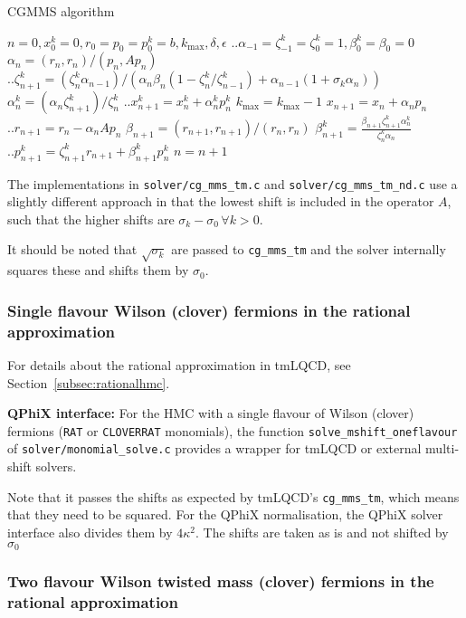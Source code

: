 \begin{algorithm}
  \caption{CGMMS algorithm}
  \label{alg:cgm}
  \begin{algorithmic}[1]
    \vspace{.2cm}
    \STATE $n=0, x_0^k = 0, r_0 = p_0 = p_0^k = b, k_\mathrm{max},
    \delta, \epsilon$
    \STATE  $\biggl.\biggr.\alpha_{-1} = \zeta_{-1}^k = \zeta_0^k = 1, \beta_0^k = \beta_0 = 0$
    \REPEAT
    \STATE $\alpha_n = (r_n, r_n) / (p_n, A p_n)$
    \STATE $\biggl.\biggr.\zeta_{n+1}^k = (\zeta^k_n  \alpha_{n-1}) / 
      (\alpha_n \beta_n(1 - \zeta_n^k / \zeta^k_{n-1}) + \alpha_{n-1}
      (1+\sigma_k\alpha_n))$
    \STATE $\alpha^k_n = (\alpha_n \zeta_{n+1}^k)/ \zeta_n^k$
    \STATE $\biggl.\biggr.x_{n+1}^k = x_n^k + \alpha_n^k p_n^k$
    \STATE $k_\mathrm{max} = k_\mathrm{max} -1$
    \ENDIF
    \ENDFOR
    \STATE $x_{n+1} = x_n + \alpha_n p_n$
    \STATE $\biggl.\biggr.r_{n+1} = r_n - \alpha_n Ap_n$
    \STATE $\beta_{n+1} = (r_{n+1}, r_{n+1}) / (r_n, r_n)$
    \STATE $\beta_{n+1}^k = \frac{\beta_{n+1} \zeta_{n+1}^k \alpha_n^k}{\zeta_{n}^k\alpha_n}$
    \STATE $\biggl.\biggr.p_{n+1}^k = \zeta_{n+1}^k r_{n+1} + \beta_{n+1}^k p_n^k$
    \STATE $n=n+1$
  \end{algorithmic}
\end{algorithm}

The implementations in \texttt{solver/cg\_mms\_tm.c} and \texttt{solver/cg\_mms\_tm\_nd.c} use a slightly different approach in that the lowest shift is included in the operator $A$, such that the higher shifts are $\sigma_k-\sigma_0\, \forall k > 0$.

It should be noted that $\sqrt{\sigma_k}$ are passed to \texttt{cg\_mms\_tm} and the solver internally squares these and shifts them by $\sigma_0$.

\subsubsection{Single flavour Wilson (clover) fermions in the rational approximation}

For details about the rational approximation in tmLQCD, see Section~\ref{subsec:rationalhmc}.

\textbf{QPhiX interface:} For the HMC with a single flavour of Wilson (clover) fermions (\texttt{RAT} or \texttt{CLOVERRAT} monomials), the function \texttt{solve\_mshift\_oneflavour} of \texttt{solver/monomial\_solve.c} provides a wrapper for tmLQCD or external multi-shift solvers.

Note that it passes the shifts as expected by tmLQCD's \texttt{cg\_mms\_tm}, which means that they need to be squared.
For the QPhiX normalisation, the QPhiX solver interface also divides them by $4\kappa^2$.
The shifts are taken as is and not shifted by $\sigma_0$

\subsubsection{Two flavour Wilson twisted mass (clover) fermions in the rational approximation}

